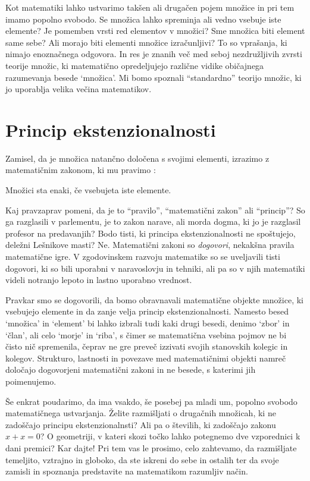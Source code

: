 Kot matematiki lahko ustvarimo takšen ali drugačen pojem množice in pri tem imamo popolno
svobodo. Se množica lahko spreminja ali vedno vsebuje iste elemente? Je pomemben vrsti red
elementov v množici? Sme množica biti element same sebe? Ali morajo biti elementi množice
izračunljivi? To so vprašanja, ki nimajo enoznačnega odgovora. In res je znanih več med
seboj nezdružljivih zvrsti teorije množic, ki matematično opredeljujejo različne vidike
običajnega razumevanja besede `množica'. Mi bomo spoznali ``standardno'' teorijo množic,
ki jo uporablja velika večina matematikov.


\section{Princip ekstenzionalnosti}
\label{sec:princip-ekstenzionalnosti}

Zamisel, da je množica natančno določena s svojimi elementi, izrazimo z matematičnim
zakonom, ki mu pravimo :

\begin{pravilo}
  Množici sta enaki, če vsebujeta iste elemente.
\end{pravilo}

Kaj pravzaprav pomeni, da je to ``pravilo'', ``matematični zakon'' ali ``princip''? So ga
razglasili v parlementu, je to zakon narave, ali morda dogma, ki jo je razglasil profesor
na predavanjih? Bodo tisti, ki principa ekstenzionalnosti ne spoštujejo, deležni Lešnikove
masti? Ne. Matematični zakoni so \emph{dogovori}, nekakšna pravila matematične igre. V
zgodovinskem razvoju matematike so se uveljavili tisti dogovori, ki so bili uporabni v
naravoslovju in tehniki, ali pa so v njih matematiki videli notranjo lepoto in lastno
uporabno vrednost.

Pravkar smo se dogovorili, da bomo obravnavali matematične objekte množice, ki vsebujejo
elemente in da zanje velja princip ekstenzionalnosti. Namesto besed `množica' in `element'
bi lahko izbrali tudi kaki drugi besedi, denimo `zbor' in `član', ali celo `morje' in
`riba', s čimer se matematična vsebina pojmov ne bi čisto nič spremenila, čeprav ne gre
preveč izzivati svojih stanovskih kolegic in kolegov. Strukturo, lastnosti in povezave med
matematičnimi objekti namreč določajo dogovorjeni matematični zakoni in ne besede, s
katerimi jih poimenujemo.

Še enkrat poudarimo, da ima vsakdo, še posebej pa mladi um, popolno svobodo matematičnega
ustvarjanja. Želite razmišljati o drugačnih množicah, ki ne zadoščajo principu
ekstenzionalnsti? Ali pa o številih, ki zadoščajo zakonu $x + x = 0$? O geometriji, v
kateri skozi točko lahko potegnemo dve vzporednici k dani premici? Kar dajte! Pri tem vas
le prosimo, celo zahtevamo, da razmišljate temeljito, vztrajno in globoko, da ste iskreni
do sebe in ostalih ter da svoje zamisli in spoznanja predstavite na matematikom razumljiv
način.

